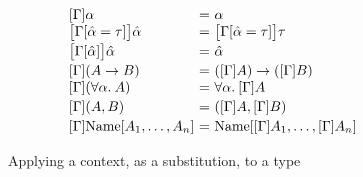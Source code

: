 \begin{figure}[h]
\begin{minipage}{0.518\textwidth}
  
  \end{minipage}
  \hfill
  \begin{minipage}{0.474\textwidth}
    \centering
      \[
  \begin{array}[t]{l@{~}c@{~}ll}
      [\Gamma]\alpha   & = &   \alpha &
      \\{}
      \big[\Gamma[\hypeq{\ahat}{\tau}]\big] \ahat
               & = &   \big[\Gamma[\hypeq{\ahat}{\tau}]\big]\tau &
      \\[2pt]
      \big[\Gamma[\ahat]\big]\ahat   & = &   \ahat &
      \\[2pt]
      [\Gamma](A \arr B)   & = &
          ([\Gamma]A) \arr ([\Gamma]B) &
      \\{}
      [\Gamma](\alltype{\alpha} A)
         & = & 
         \alltype{\alpha} [\Gamma]A &
      \\[2pt]
      [\Gamma](A, B) 
         & = &
         ([\Gamma]A, [\Gamma]B)
      \\[2pt]
      [\Gamma]\Unionname[A_1,\dots, A_n]
         & = &
         \Unionname[[\Gamma]A_1,\dots, [\Gamma]A_n]
  \end{array}
  \]
  \captionsetup{justification=centering}\caption{Applying a context, as a substitution, to a type}
  \end{minipage}
\end{figure}
